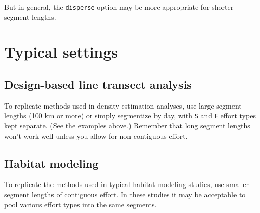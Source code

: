 \documentclass[
]{book}
\begin{document}
But in general, the \texttt{disperse} option may be more appropriate for shorter segment lengths.

\hypertarget{typical-settings}{%
\section*{Typical settings}\label{typical-settings}}

\hypertarget{design-based-line-transect-analysis}{%
\subsection*{Design-based line transect analysis}\label{design-based-line-transect-analysis}}

To replicate methods used in density estimation analyses, use large segment lengths (100 km or more) or simply segmentize by day, with \texttt{S} and \texttt{F} effort types kept separate. (See the examples above.) Remember that long segment lengths won't work well unless you allow for non-contiguous effort.

\hypertarget{habitat-modeling}{%
\subsection*{Habitat modeling}\label{habitat-modeling}}

To replicate the methods used in typical habitat modeling studies, use smaller segment lengths of contiguous effort. In these studies it may be acceptable to pool various effort types into the same segments.
\end{document}
